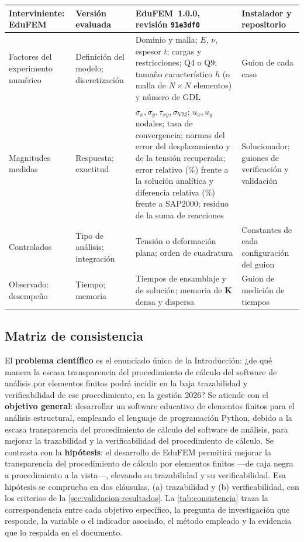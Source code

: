{\begin{longtable}{@{}>{\raggedright\arraybackslash}p{2.9cm}>{\raggedright\arraybackslash}p{2.5cm}>{\raggedright\arraybackslash}p{5.5cm}>{\raggedright\arraybackslash}p{2.7cm}@{}}
Interviniente: EduFEM & Versión evaluada & EduFEM~1.0.0, revisión \texttt{91e3df0} & Instalador y repositorio \\
\midrule
Factores del experimento numérico & Definición del modelo; discretización & Dominio y malla; $E$, $\nu$, espesor $t$; cargas y restricciones; Q4 o Q9; tamaño característico $h$ (o malla de $N\times N$ elementos) y número de GDL & Guion de cada caso \\
Magnitudes medidas & Respuesta; exactitud & $\sigma_x,\sigma_y,\tau_{xy},\sigma_{\mathrm{VM}}$; $u_x,u_y$ nodales; tasa de convergencia; normas del error del desplazamiento y de la tensión recuperada; error relativo (\%) frente a la solución analítica y diferencia relativa (\%) frente a SAP2000; residuo de la suma de reacciones & Solucionador; guiones de verificación y validación \\
Controlados & Tipo de análisis; integración & Tensión o deformación plana; orden de cuadratura & Constantes de cada configuración del guion \\
Observado: desempeño & Tiempo; memoria & Tiempos de ensamblaje y de solución; memoria de $\bm{K}$ densa y dispersa & Guion de medición de tiempos \\
\end{longtable}}

\subsection{Matriz de consistencia}
\label{sec:matriz-consistencia}

El \textbf{problema científico} es el enunciado único de la Introducción: ¿de qué manera la escasa transparencia del procedimiento de cálculo del software de análisis por elementos finitos podrá incidir en la baja trazabilidad y verificabilidad de ese procedimiento, en la gestión 2026? Se atiende con el \textbf{objetivo general}: desarrollar un software educativo de elementos finitos para el análisis estructural, empleando el lenguaje de programación Python, debido a la escasa transparencia del procedimiento de cálculo del software de análisis, para mejorar la trazabilidad y la verificabilidad del procedimiento de cálculo. Se contrasta con la \textbf{hipótesis}: el desarrollo de EduFEM permitirá mejorar la transparencia del procedimiento de cálculo por elementos finitos ---de caja negra a procedimiento a la vista---, elevando su trazabilidad y su verificabilidad. Esa hipótesis se comprueba en dos cláusulas, (a) trazabilidad y (b) verificabilidad, con los criterios de la \autoref{sec:validacion-resultados}. La \autoref{tab:consistencia} traza la correspondencia entre cada objetivo específico, la pregunta de investigación que responde, la variable o el indicador asociado, el método empleado y la evidencia que lo respalda en el documento.

